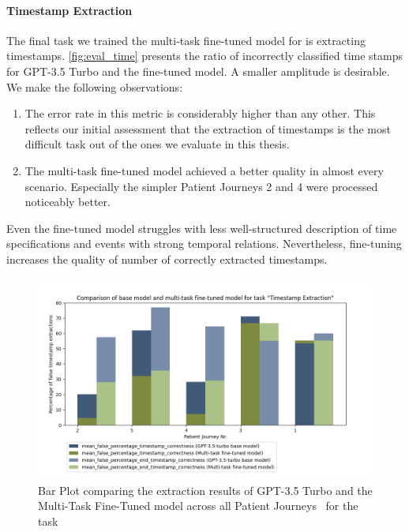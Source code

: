 \paragraph{Timestamp Extraction}
The final task we trained the multi-task fine-tuned model for is extracting timestamps. \autoref{fig:eval_time} presents the ratio of incorrectly classified time stamps for GPT-3.5 Turbo and the fine-tuned model. A smaller amplitude is desirable. We make the following observations:
\begin{enumerate}
    \item The error rate in this metric is considerably higher than any other. This reflects our initial assessment that the extraction of timestamps is the most difficult task out of the ones we evaluate in this thesis.
    \item The multi-task fine-tuned model achieved a better quality in almost every scenario. Especially the simpler Patient Journeys 2 and 4 were processed noticeably better.
\end{enumerate}
Even the fine-tuned model struggles with less well-structured description of time specifications and events with strong temporal relations. Nevertheless, fine-tuning increases the quality of number of correctly extracted timestamps.
\begin{figure}
    \centering
    \includegraphics[width=\textwidth]{bachelor_thesis/images/timestamp_all.png}
    \caption{Bar Plot comparing the extraction results of GPT-3.5 Turbo and the Multi-Task Fine-Tuned model across all Patient Journeys~ for the task }
    \label{fig:eval_time}
\end{figure}



